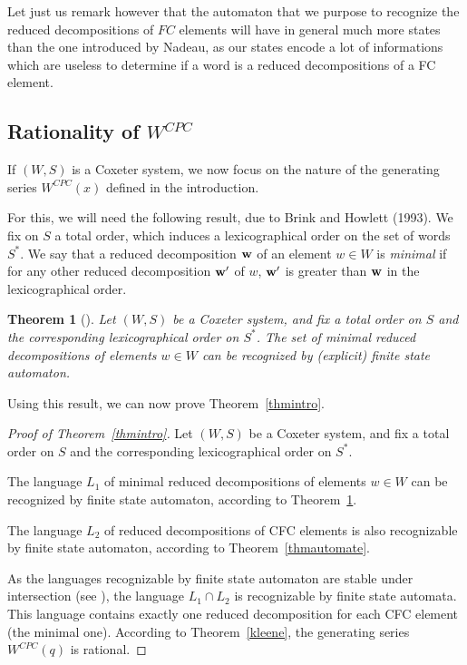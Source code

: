 \documentclass[reqno,12pt]{amsart}
\newtheorem{Theorem}{Theorem}[section]
\theoremstyle{definition}
\begin{document}
Let just us remark however that the automaton that we purpose to recognize the reduced decompositions  of $FC$ elements will have in general much more states than the one introduced by Nadeau, as our states encode a lot of informations which are useless to determine if a word is a reduced decompositions of a FC element. 

\subsection{Rationality of $W^{CPC}$}\label{3.2}

If $(W,S)$ is a Coxeter system, we now focus on the nature of the generating series  $W^{CPC}(x)$ defined in the introduction.

For this, we will need the following result, due to Brink and Howlett (1993). We fix on $S$ a total order, which induces a lexicographical order on the set of words  $S^*$. We say that a reduced decomposition  ${\bf w}$ of an element $w \in W$ is \emph{minimal} if for any other reduced decomposition ${\bf w'}$ of $w$, ${\bf w'}$ is greater than ${\bf w}$ in the lexicographical order.

\begin{Theorem}[{\cite[Proposition 3.3 ]{BH}}]\label{anisimov}
Let $(W,S)$ be a Coxeter system, and fix a total order on $S$ and the corresponding lexicographical order on $S^*$. The set of minimal reduced decompositions of elements  $w\in W$ can be recognized by (explicit) finite state automaton.
\end{Theorem}

Using this result, we can now prove Theorem~\ref{thmintro}.



\begin{proof}[Proof of Theorem~\ref{thmintro}]
Let $(W,S)$ be a Coxeter system, and  fix a total order on $S$ and the corresponding lexicographical order on $S^*$.

The language $L_1$ of minimal reduced decompositions of elements $w \in W$ can be recognized by finite state automaton, according to Theorem~\ref{anisimov}. 

The language $L_2$ of reduced decompositions of CFC elements is also recognizable by finite state automaton, according to Theorem~\ref{thmautomate}.
 
 As the languages recognizable by finite state automaton are stable under intersection   (see \cite[Theorem 3.3]{HOP}), the language $L_1 \cap L_2$ is recognizable by finite state automata.  This language contains exactly one reduced decomposition for each CFC element (the minimal one).  According to Theorem~\ref{kleene}, the generating series $W^{CPC}(q)$ is rational.
\end{proof}
\end{document}
